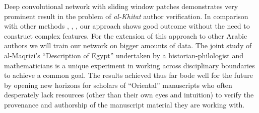 \documentclass[conference,a4paper,twocolumn]{IEEEtran}
\begin{document}
Deep convolutional network with sliding window patches demonstrates very prominent result in the problem of {\it al-Khitat} author verification. In comparison with other methods \cite{MBulacu}, \cite{MBulacu1}, \cite{DFecker}, \cite{Salvador} our approach shows good outcome without the need to construct complex features. For the extension of this approach to other Arabic authors we will train our network on bigger amounts of data. The joint study of al-Maqrizi's ``Description of Egypt'' undertaken by a historian-philologist and mathematicians is a unique experiment in working across disciplinary boundaries to achieve a common goal. The results achieved thus far bode well for the future by opening new horizons for scholars of ``Oriental'' manuscripts who often desperately lack resources (other than their own eyes and intuition) to verify the provenance and authorship of the manuscript material they are working with.


%
%
%
\end{document}
